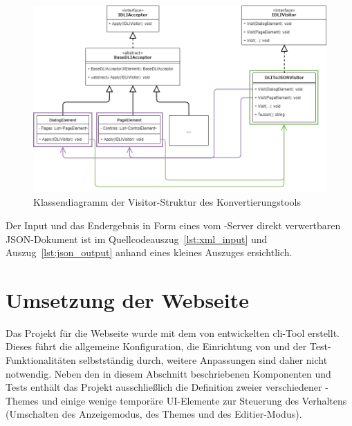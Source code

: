 \begin{figure}
    \centering
    \captionsetup{justification=centering}
    \includegraphics[width=\textwidth]{figures/web-converter_class-diagramm.png}
        \caption{Klassendiagramm der Visitor-Struktur des Konvertierungstools}\label{fig:web-conv_class-diagramm}
\end{figure}

Der Input und das Endergebnis in Form eines vom -Server direkt verwertbaren JSON-Dokument ist im Quellcodeauszug~\ref{lst:xml_input} und Auszug~\ref{lst:json_output} anhand eines kleines Auszuges ersichtlich.





\section{Umsetzung der Webseite}
Das Projekt für die Webseite wurde mit dem von  entwickelten \gls{cli}-Tool  erstellt. Dieses führt die allgemeine Konfiguration, die Einrichtung von  und der Test-Funktionalitäten selbstständig durch, weitere Anpassungen sind daher nicht notwendig. Neben den in diesem Abschnitt beschriebenen Komponenten und Tests enthält das Projekt ausschließlich die Definition zweier verschiedener -Themes und einige wenige temporäre UI-Elemente zur Steuerung des Verhaltens (Umschalten des Anzeigemodus, des Themes und des Editier-Modus).

